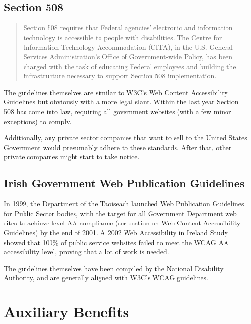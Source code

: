 \subsection{Section 508}

\begin{quotation}

Section 508 requires that Federal agencies' electronic and information
technology is accessible to people with disabilities. The Centre for
Information Technology Accommodation (CITA), in the U.S. General Services
Administration's Office of Government-wide Policy, has been charged with the
task of educating Federal employees and building the infrastructure necessary
to support Section 508 implementation.\cite{section508}

\end{quotation}

The guidelines themselves are similar to W3C's Web Content Accessibility
Guidelines but obviously with a more legal slant. Within the last year Section
508 has come into law, requiring all government websites (with a few minor
exceptions) to comply. 

Additionally, any private sector companies that want to sell to the United
States Government would presumably adhere to these standards. After that,
other private companies might start to take notice.

\subsection{Irish Government Web Publication Guidelines}

In 1999, the Department of the Taoiseach launched Web Publication Guidelines
for Public Sector bodies\cite{irishgov}, with the target for all Government
Department web sites to achieve level AA compliance (see section on Web Content
Accessibility Guidelines) by the end of 2001. A 2002 Web Accessibility in
Ireland Study\cite{warp2002} showed that 100\% of public service websites
failed to meet the WCAG AA accessibility level, proving that a lot of work is
needed.

The guidelines themselves have been compiled by the National Disability
Authority\cite{nda:accessit}, and are generally aligned with W3C's WCAG
guidelines.

\section{Auxiliary Benefits}

